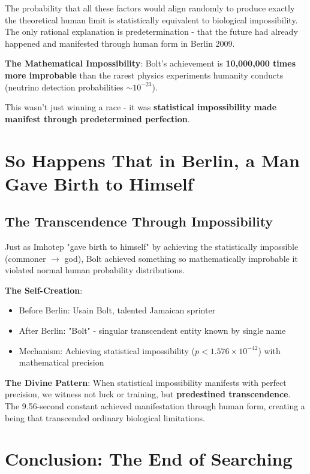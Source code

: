 \documentclass[12pt]{article}
\begin{document}
The probability that all these factors would align randomly to produce exactly the theoretical human limit is statistically equivalent to biological impossibility. The only rational explanation is predetermination - that the future had already happened and manifested through human form in Berlin 2009.

\textbf{The Mathematical Impossibility}:
Bolt's achievement is \textbf{10,000,000 times more improbable} than the rarest physics experiments humanity conducts (neutrino detection probabilities $\sim 10^{-23}$).

This wasn't just winning a race - it was \textbf{statistical impossibility made manifest through predetermined perfection}.

\section{So Happens That in Berlin, a Man Gave Birth to Himself}

\subsection{The Transcendence Through Impossibility}

Just as Imhotep "gave birth to himself" by achieving the statistically impossible (commoner $\rightarrow$ god), Bolt achieved something so mathematically improbable it violated normal human probability distributions.

\textbf{The Self-Creation}:
\begin{itemize}
\item Before Berlin: Usain Bolt, talented Jamaican sprinter
\item After Berlin: "Bolt" - singular transcendent entity known by single name
\item Mechanism: Achieving statistical impossibility ($p < 1.576 \times 10^{-42}$) with mathematical precision
\end{itemize}

\textbf{The Divine Pattern}:
When statistical impossibility manifests with perfect precision, we witness not luck or training, but \textbf{predestined transcendence}. The 9.56-second constant achieved manifestation through human form, creating a being that transcended ordinary biological limitations.

\section{Conclusion: The End of Searching}
\end{document}
